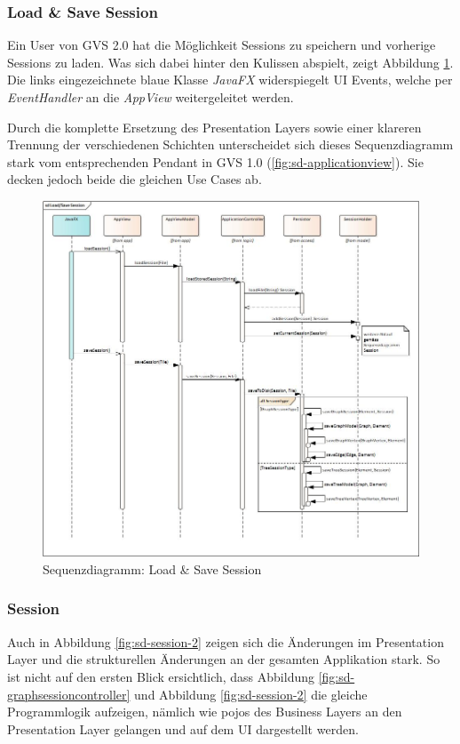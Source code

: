 \documentclass[11pt,a4paper,english,oneside]{book}
\numberwithin{equation}{chapter}
\begin{document}
	\subsubsection{Load \& Save Session}
	Ein User von GVS 2.0 hat die Möglichkeit Sessions zu speichern und vorherige Sessions zu laden. Was sich dabei hinter den Kulissen abspielt, zeigt Abbildung \ref{fig:sd-load_save_session-2}. Die links eingezeichnete blaue Klasse \textit{JavaFX} widerspiegelt UI Events, welche per \textit{EventHandler} an die \textit{AppView} weitergeleitet werden.
	
	Durch die komplette Ersetzung des Presentation Layers sowie einer klareren Trennung der verschiedenen Schichten unterscheidet sich dieses Sequenzdiagramm stark vom entsprechenden Pendant in GVS 1.0 (\ref{fig:sd-applicationview}). Sie decken jedoch beide die gleichen Use Cases ab.
	
	\begin{figure}[h!]
		\centering
		\includegraphics[width=\linewidth]{assets/images/sequence_LoadSave_Session}
		\caption{Sequenzdiagramm: Load \& Save Session}
		\label{fig:sd-load_save_session-2}
	\end{figure}
	
	\clearpage
	
	\subsubsection{Session}	
	Auch in Abbildung \ref{fig:sd-session-2} zeigen sich die Änderungen im Presentation Layer und die strukturellen Änderungen an der gesamten Applikation stark. So ist nicht auf den ersten Blick ersichtlich, dass Abbildung \ref{fig:sd-graphsessioncontroller} und Abbildung \ref{fig:sd-session-2} die gleiche Programmlogik aufzeigen, nämlich wie \gls{pojo}s des Business Layers an den Presentation Layer gelangen und auf dem UI dargestellt werden.
	
\end{document}
